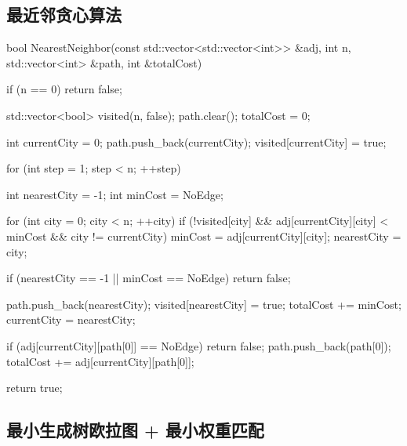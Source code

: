 \subsection{最近邻贪心算法}

\begin{cppcode}
bool NearestNeighbor(const std::vector<std::vector<int>> &adj, int n, std::vector<int> &path, int &totalCost) {
    if (n == 0) return false;

    std::vector<bool> visited(n, false);
    path.clear();
    totalCost = 0;

    int currentCity = 0;
    path.push_back(currentCity);
    visited[currentCity] = true;

    for (int step = 1; step < n; ++step) {
        int nearestCity = -1;
        int minCost = NoEdge;

        for (int city = 0; city < n; ++city) {
            if (!visited[city] && adj[currentCity][city] < minCost && city != currentCity) {
                minCost = adj[currentCity][city];
                nearestCity = city;
            }
        }

        if (nearestCity == -1 || minCost == NoEdge) {
            return false;
        }

        path.push_back(nearestCity);
        visited[nearestCity] = true;
        totalCost += minCost;
        currentCity = nearestCity;
    }

    if (adj[currentCity][path[0]] == NoEdge) {
        return false;
    }
    path.push_back(path[0]);
    totalCost += adj[currentCity][path[0]];

    return true;
}
\end{cppcode}

\subsection{最小生成树欧拉图 + 最小权重匹配}

